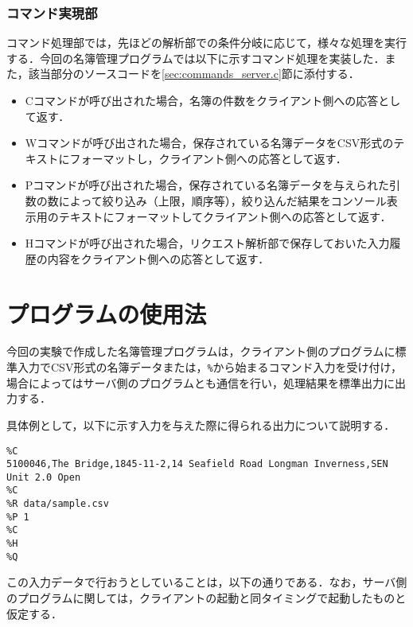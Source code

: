 \documentclass[11pt]{jsarticle}
\begin{document}
\subsubsection{コマンド実現部}

コマンド処理部では，先ほどの解析部での条件分岐に応じて，様々な処理を実行する．今回の名簿管理プログラムでは以下に示すコマンド処理を実装した．また，該当部分のソースコードを\ref{sec:commands_server.c}節に添付する．

\begin{itemize}
      \item Cコマンドが呼び出された場合，名簿の件数をクライアント側への応答として返す．
      \item Wコマンドが呼び出された場合，保存されている名簿データをCSV形式のテキストにフォーマットし，クライアント側への応答として返す．
      \item Pコマンドが呼び出された場合，保存されている名簿データを与えられた引数の数によって絞り込み（上限，順序等），絞り込んだ結果をコンソール表示用のテキストにフォーマットしてクライアント側への応答として返す．
      \item Hコマンドが呼び出された場合，リクエスト解析部で保存しておいた入力履歴の内容をクライアント側への応答として返す．
\end{itemize}

\section{プログラムの使用法}

今回の実験で作成した名簿管理プログラムは，クライアント側のプログラムに標準入力でCSV形式の名簿データまたは，{\tt \%}から始まるコマンド入力を受け付け，場合によってはサーバ側のプログラムとも通信を行い，処理結果を標準出力に出力する．

具体例として，以下に示す入力を与えた際に得られる出力について説明する．

\begin{verbatim}
%C
5100046,The Bridge,1845-11-2,14 Seafield Road Longman Inverness,SEN Unit 2.0 Open
%C
%R data/sample.csv
%P 1
%C
%H
%Q
\end{verbatim}

この入力データで行おうとしていることは，以下の通りである．なお，サーバ側のプログラムに関しては，クライアントの起動と同タイミングで起動したものと仮定する．
\end{document}
